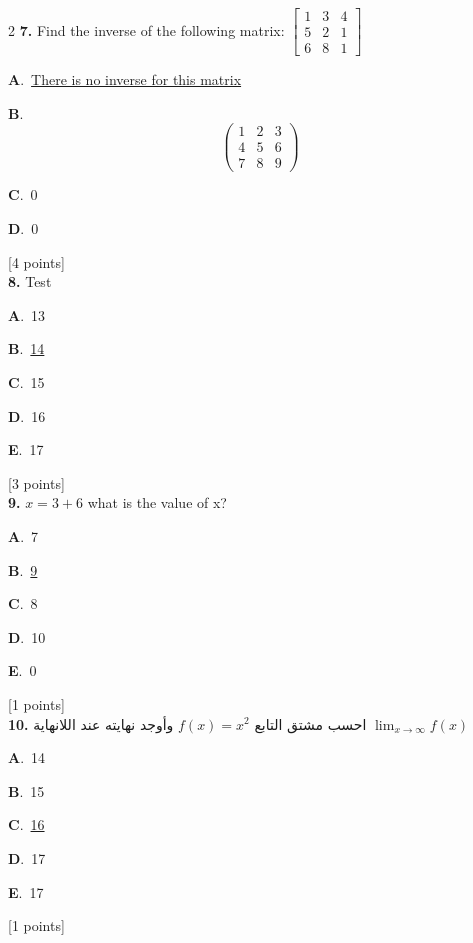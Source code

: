 \documentclass[12pt]{article}
\newcommand{\choice}[3]{%
  \noindent\textbf{#1}.~#2\hfill#3\par\vspace{0.25em}
}
\begin{document}
\begin{multicols}{2}
\noindent \textbf{\textenglish{7.}} {\textenglish{Find the inverse of the following matrix: }}\(\begin{bmatrix} 1 & 3 & 4 \\ 5 & 2 & 1 \\ 6 & 8 & 1 \end{bmatrix}\)

\noindent\choice{A}{\underline{{\textenglish{There is no inverse for this matrix}}}}{}
\noindent\choice{B}{\[\begin{pmatrix} 1 & 2 & 3 \\ 4 & 5 & 6 \\ 7 & 8 & 9  \end{pmatrix}\]}{}
\noindent\choice{C}{{\textenglish{0}}}{}
\noindent\choice{D}{{\textenglish{0}}}{}
\hfill {\textenglish{[4 points]}}\\[0.5em]

\noindent \textbf{\textenglish{8.}} {\textenglish{Test}}

\noindent\choice{A}{{\textenglish{13}}}{}
\noindent\choice{B}{\underline{{\textenglish{14}}}}{}
\noindent\choice{C}{{\textenglish{15}}}{}
\noindent\choice{D}{{\textenglish{16}}}{}
\noindent\choice{E}{{\textenglish{17}}}{}
\hfill {\textenglish{[3 points]}}\\[0.5em]

\noindent \textbf{\textenglish{9.}} \(x=3+6 \){\textenglish{ what is the value of x?}}

\noindent\choice{A}{{\textenglish{7}}}{}
\noindent\choice{B}{\underline{{\textenglish{9}}}}{}
\noindent\choice{C}{{\textenglish{8}}}{}
\noindent\choice{D}{{\textenglish{10}}}{}
\noindent\choice{E}{{\textenglish{0}}}{}
\hfill {\textenglish{[1 points]}}\\[0.5em]

\noindent \textbf{\textenglish{10.}} {\textarabic{احسب مشتق التابع }}\( f(x) = x^2\){\textarabic{ وأوجد نهايته عند اللانهاية }}\(\lim_{x \to \infty}f(x)\)

\noindent\choice{A}{{\textenglish{14}}}{}
\noindent\choice{B}{{\textenglish{15}}}{}
\noindent\choice{C}{\underline{{\textenglish{16}}}}{}
\noindent\choice{D}{{\textenglish{17}}}{}
\noindent\choice{E}{{\textenglish{17}}}{}
\hfill {\textenglish{[1 points]}}\\[0.5em]


\end{multicols}
\end{document}
